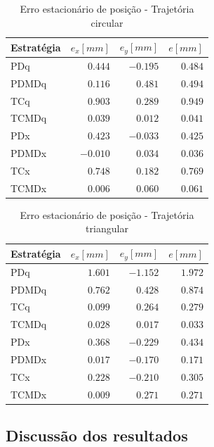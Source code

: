 \documentclass[]{politex}
\begin{document}
\begin{table}[H] 
\centering
\caption{Erro estacionário de posição - Trajetória circular}
\label{tab:valorFinalCirculo}
\begin{tabular}{l|r|r|r}
Estratégia & $e_x [mm]$ & $e_y [mm]$ & $e [mm]$ \\ \hline
PDq        & $ 0.444$   & $-0.195$   & $0.484$  \\
PDMDq      & $ 0.116$   & $ 0.481$   & $0.494$  \\
TCq        & $ 0.903$   & $ 0.289$   & $0.949$  \\
TCMDq      & $ 0.039$   & $ 0.012$   & $0.041$  \\
PDx        & $ 0.423$   & $-0.033$   & $0.425$  \\
PDMDx      & $-0.010$   & $ 0.034$   & $0.036$  \\
TCx        & $ 0.748$   & $ 0.182$   & $0.769$  \\
TCMDx      & $ 0.006$   & $ 0.060$   & $0.061$  \\
\end{tabular}
\end{table}

\begin{table}[H] 
\centering
\caption{Erro estacionário de posição - Trajetória triangular}
\label{tab:valorFinalTriangulo}
\begin{tabular}{l|r|r|r}
Estratégia & $e_x [mm]$ & $e_y [mm]$ & $e [mm]$ \\ \hline
PDq        & $ 1.601$   & $-1.152$   & $1.972$  \\
PDMDq      & $ 0.762$   & $ 0.428$   & $0.874$  \\
TCq        & $ 0.099$   & $ 0.264$   & $0.279$  \\
TCMDq      & $ 0.028$   & $ 0.017$   & $0.033$  \\
PDx        & $ 0.368$   & $-0.229$   & $0.434$  \\
PDMDx      & $ 0.017$   & $-0.170$   & $0.171$  \\
TCx        & $ 0.228$   & $-0.210$   & $0.305$  \\
TCMDx      & $ 0.009$   & $ 0.271$   & $0.271$  \\
\end{tabular}
\end{table}

\subsection{Discussão dos resultados}
\end{document}
